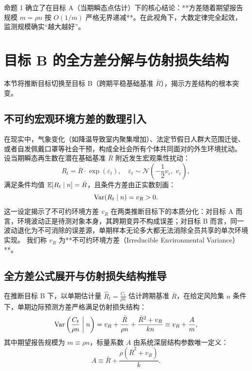 命题 1 确立了在目标 A（当期瞬态点估计）下的核心结论：**方差随着期望报告规模 $m = \rho n$ 按 $O(1/m)$ 严格无界递减**。在此视角下，大数定律完全起效，监测规模确实“越大越好”。

\section{目标 B 的全方差分解与仿射损失结构}\label{sec:prop2}

本节将推断目标切换至目标 B（跨期平稳基础基准 $\bar{R}$），揭示方差结构的根本突变。

\subsection{不可约宏观环境方差的数理引入}
在现实中，气象变化（如降温导致室内聚集增加）、法定节假日人群大范围迁徙、或者自发佩戴口罩等社会干预，构成全社会所有个体共同面对的外生环境扰动。
设当期瞬态再生数在潜在基础基准 $\bar{R}$ 附近发生宏观乘性扰动：
\begin{equation}
R_t = \bar{R} \cdot \exp(\varepsilon_t), \quad \varepsilon_t \sim \mathcal{N}\left(-\frac{1}{2}v_\varepsilon, \; v_\varepsilon\right),
\end{equation}
满足条件均值 $\operatorname{\mathbb{E}}[R_t \mid n] = \bar{R}$，且条件方差由正实数刻画：
\begin{equation}
\operatorname{Var}(R_t \mid n) = v_R > 0.
\end{equation}
这一设定揭示了不可约环境方差 $v_R$ 在两类推断目标下的本质分化：对目标 A 而言，环境波动正是待测对象本身，其跨期变异不构成误差；对目标 B 而言，同一波动退化为不可消除的误差源，单期样本无论多大都无法消除全员共享的单次环境实现。
我们称 $v_R$ 为**不可约环境方差（Irreducible Environmental Variance）**。
\subsection{全方差公式展开与仿射损失结构推导}

\begin{proposition}\label{prop:prop2}
在推断目标 B 下，以单期估计量 $\widehat{R}_t = \frac{C_t}{\rho n}$ 估计跨期基准 $\bar{R}$，在给定风险集 $n$ 条件下，单期边际预测方差严格满足仿射损失结构：
\begin{equation}
\operatorname{Var}\left( \frac{C_t}{\rho n} \;\middle|\; n \right) = v_R + \frac{\bar{R}}{\rho n} + \frac{\bar{R}^2 + v_R}{kn} \equiv v_R + \frac{A}{m}, \label{eq:affine_variance}
\end{equation}
其中期望报告规模为 $m \equiv \rho n$，标量系数 $A$ 由系统深层结构参数唯一定义：
\begin{equation}
A \equiv \bar{R} + \frac{\rho(\bar{R}^2 + v_R)}{k}. \label{eq:scalar_A_def}
\end{equation}
\end{proposition}

